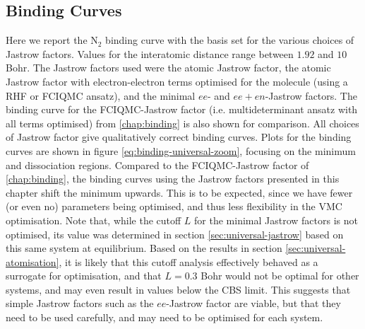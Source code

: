 \subsection{Binding Curves}

Here we report the N$_2$ binding curve with the \avtz basis set for the various choices of Jastrow factors. Values for the interatomic distance range between $1.92$ and $10$ Bohr. The Jastrow factors used were the atomic Jastrow factor, the atomic Jastrow factor with electron-electron terms optimised for the molecule (using a RHF or FCIQMC ansatz), and the minimal $ee$- and $ee+en$-Jastrow factors.  The binding curve for the FCIQMC-Jastrow factor (i.e. multideterminant ansatz with all terms optimised) from \autoref{chap:binding} is also shown for comparison. All choices of Jastrow factor give qualitatively correct binding curves.
Plots for the binding curves are shown in figure \ref{eq:binding-universal-zoom}, focusing on the minimum and dissociation regions. Compared to the FCIQMC-Jastrow factor of \autoref{chap:binding}, the binding curves using the Jastrow factors presented in this chapter shift the minimum upwards. This is to be expected, since we have fewer (or even no) parameters being optimised, and thus less flexibility in the VMC optimisation. Note that, while the cutoff $L$ for the minimal Jastrow factors is not optimised, its value was determined in section \ref{sec:universal-jastrow} based on this same system at equilibrium. Based on the results in section \ref{sec:universal-atomisation}, it is likely that this cutoff analysis effectively behaved as a surrogate for optimisation, and that $L=0.3$ Bohr would not be optimal for other systems, and may even result in values below the CBS limit. This suggests that simple Jastrow factors such as the $ee$-Jastrow factor are viable, but that they need to be used carefully, and may need to be optimised for each system.

